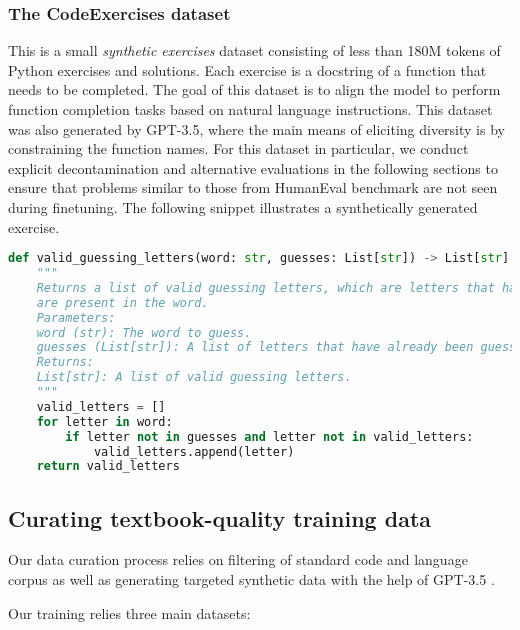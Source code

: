 \subsubsection*{The CodeExercises dataset}
This is a small \textit{synthetic exercises} dataset consisting of less than 180M tokens of Python exercises and solutions. Each exercise is a docstring of a function that needs to be completed. The goal of this dataset is to align the model to perform function completion tasks based on natural language instructions. This dataset was also generated by GPT-3.5, where the main means of eliciting diversity is by constraining the function names. For this dataset in particular, we conduct explicit decontamination and alternative evaluations in the following sections to ensure that problems similar to those from HumanEval benchmark are not seen during finetuning. %
The following snippet illustrates a synthetically generated  exercise.%
\begin{AIbox}{}
\begin{lstlisting}[language=Python, style=mystyle]
def valid_guessing_letters(word: str, guesses: List[str]) -> List[str]:
    """
    Returns a list of valid guessing letters, which are letters that have not been guessed yet and 
    are present in the word.
    Parameters:
    word (str): The word to guess.
    guesses (List[str]): A list of letters that have already been guessed.
    Returns:
    List[str]: A list of valid guessing letters.
    """
    valid_letters = []
    for letter in word:
        if letter not in guesses and letter not in valid_letters:
            valid_letters.append(letter)
    return valid_letters
\end{lstlisting}
\end{AIbox}
\iffalse
\subsection{Curating textbook-quality training data} 
Our data curation process relies on filtering of standard code and language corpus as well as generating targeted synthetic data with the help of GPT-3.5 \cite{ouyang2022training,gpt4}. 

Our training relies three main datasets:

